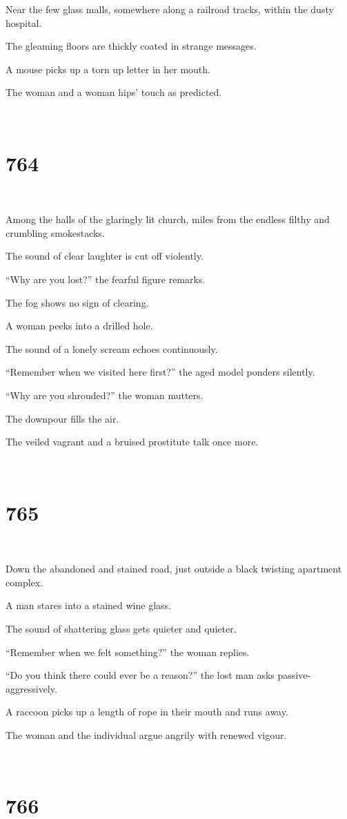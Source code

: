 \documentclass{report}
\begin{document}
Near the few glass malls, somewhere along a railroad tracks, within the dusty hospital.

The gleaming floors are thickly coated in strange messages.

A mouse picks up a torn up letter in her mouth.

The woman and a woman hips' touch as predicted.

~
\chapter*{764}
~

Among the halls of the glaringly lit church, miles from the endless filthy and crumbling smokestacks.

The sound of clear laughter is cut off violently.

``Why are you lost?'' the fearful figure remarks.

The fog shows no sign of clearing.

A woman peeks into a drilled hole.

The sound of a lonely scream echoes continuously.

``Remember when we visited here first?'' the aged model ponders silently.

``Why are you shrouded?'' the woman mutters.

The downpour fills the air.

The veiled vagrant and a bruised prostitute talk once more.

~
\chapter*{765}
~

Down the abandoned and stained road, just outside a black twisting apartment complex.

A man stares into a stained wine glass.

The sound of shattering glass gets quieter and quieter.

``Remember when we felt something?'' the woman replies.

``Do you think there could ever be a reason?'' the lost man asks passive-aggressively.

A raccoon picks up a length of rope in their mouth and runs away.

The woman and the individual argue angrily with renewed vigour.

~
\chapter*{766}
~
\end{document}
